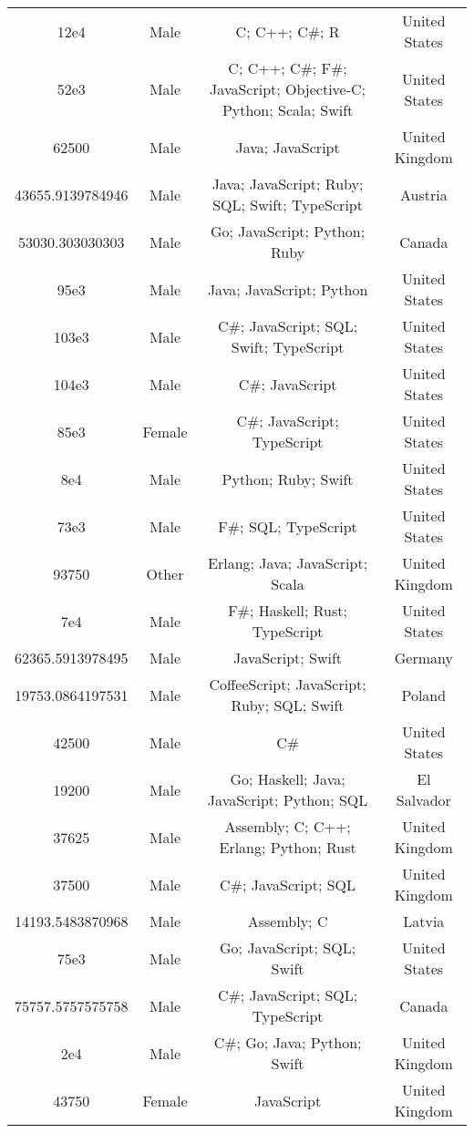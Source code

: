\begin{center}
\begin{tabular}{ |c|c|c|c| }
12e4  &  Male  &  C; C++; C\#; R  &  United States  \\ 
52e3  &  Male  &  C; C++; C\#; F\#; JavaScript; Objective-C; Python; Scala; Swift  &  United States  \\ 
62500  &  Male  &  Java; JavaScript  &  United Kingdom  \\ 
43655.9139784946  &  Male  &  Java; JavaScript; Ruby; SQL; Swift; TypeScript  &  Austria  \\ 
53030.303030303  &  Male  &  Go; JavaScript; Python; Ruby  &  Canada  \\ 
95e3  &  Male  &  Java; JavaScript; Python  &  United States  \\ 
103e3  &  Male  &  C\#; JavaScript; SQL; Swift; TypeScript  &  United States  \\ 
104e3  &  Male  &  C\#; JavaScript  &  United States  \\ 
85e3  &  Female  &  C\#; JavaScript; TypeScript  &  United States  \\ 
8e4  &  Male  &  Python; Ruby; Swift  &  United States  \\ 
73e3  &  Male  &  F\#; SQL; TypeScript  &  United States  \\ 
93750  &  Other  &  Erlang; Java; JavaScript; Scala  &  United Kingdom  \\ 
7e4  &  Male  &  F\#; Haskell; Rust; TypeScript  &  United States  \\ 
62365.5913978495  &  Male  &  JavaScript; Swift  &  Germany  \\ 
19753.0864197531  &  Male  &  CoffeeScript; JavaScript; Ruby; SQL; Swift  &  Poland  \\ 
42500  &  Male  &  C\#  &  United States  \\ 
19200  &  Male  &  Go; Haskell; Java; JavaScript; Python; SQL  &  El Salvador  \\ 
37625  &  Male  &  Assembly; C; C++; Erlang; Python; Rust  &  United Kingdom  \\ 
37500  &  Male  &  C\#; JavaScript; SQL  &  United Kingdom  \\ 
14193.5483870968  &  Male  &  Assembly; C  &  Latvia  \\ 
75e3  &  Male  &  Go; JavaScript; SQL; Swift  &  United States  \\ 
75757.5757575758  &  Male  &  C\#; JavaScript; SQL; TypeScript  &  Canada  \\ 
2e4  &  Male  &  C\#; Go; Java; Python; Swift  &  United Kingdom  \\ 
43750  &  Female  &  JavaScript  &  United Kingdom  \\ 

\end{tabular}
\end{center}
